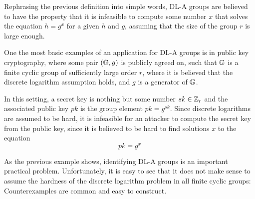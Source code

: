Rephrasing the previous definition into simple words, DL-A groups are believed to have the property that it is infeasible to compute some number $x$ that solves the equation $h=g^x$ for a given $h$ and $g$, assuming that the size of the group $r$ is large enough.
\begin{example}
One the most basic examples of an application for DL-A groups is in public key cryptography, where some pair $(\mathbb{G},g)$ is publicly agreed on, such that $\mathbb{G}$ is a finite cyclic group of sufficiently large order $r$, where it is believed that the discrete logarithm assumption holds, and $g$ is a generator of $\mathbb{G}$.

In this setting, a secret key is nothing but some number $sk\in \mathbb{Z}_r$ and the associated public key $pk$ is the group element $pk=g^{sk}$. Since discrete logarithms are assumed to be hard, it is infeasible for an attacker to compute the secret key from the public key, since it is believed to be hard to find solutions $x$ to the equation 
$$
pk = g^{x}
$$ 
\end{example}
As the previous example shows, identifying DL-A groups is an important practical problem. Unfortunately, it is easy to see that it does not make sense to assume the hardness of the discrete logarithm problem in all finite cyclic groups: Counterexamples are common and easy to construct. 
